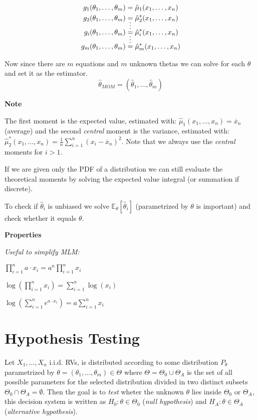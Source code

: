 \documentclass[8pt,a4paper]{extarticle}     %
\newcommand{\colfill}{\vfill\eject\columnbreak}
\begin{document}
\begin{multicols}{4}
\begin{boxguide}[Evaluation]
\begin{listnr}
		\begin{align*}
			g_1(\theta_1,\dots,\theta_m) &= \hat{\mu}_1(x_1,\dots,x_n) \\
			g_2(\theta_1,\dots,\theta_m) &= \hat{\mu}_2^*(x_1,\dots,x_n) \\ 
			&\shortvdotswithin{=} 
			g_i(\theta_1,\dots,\theta_m) &= \hat{\mu}_i^*(x_1,\dots,x_n) \\ 
			&\shortvdotswithin{=} 
			g_m(\theta_1,\dots,\theta_m) &= \hat{\mu}_m^*(x_1,\dots,x_n) 
		\end{align*}
		\item Now since there are $m$ equations and $m$ unknown thetas we can solve for each $\theta$ and set it as the estimator.
		\[
			\hat{\theta}_{MOM}=(\hat{\theta}_1,\dots,\hat{\theta}_m)
		\]
	\end{listnr}
\end{boxguide}
\begin{listb}
	\item [] \textbf{Note}
	\item The first moment is the expected value, estimated with: $\hat{\mu}_1(x_1,\dots,x_n) = \overline{x}_n$ (average) and the second \textit{central} moment is the variance, estimated with: $\hat{\mu}_2^*(x_1,\dots,x_n) = \frac{1}{n}\sum_{i=1}^{n}(x_i-\overline{x}_n)^2$. Note that we always use the \textit{central} moments for $i>1$. 
	\item If we are given only the PDF of a distribution we can still evaluate the theoretical moments by solving the expected value integral (or summation if discrete). 
	\item To check if $\hat{\theta}_i$ is unbiased we solve $\mathbb{E}_\theta[\hat{\theta}_i]$ (parametrized by $\theta$ is important) and check whether it equals $\theta$. 
	\item [] \textbf{Properties} 
	\item [] \textit{Useful to simplify MLM: } 
	\item $\prod_{i=1}^{n}a\cdot x_i = a^n\prod_{i=1}^{n}x_i$ 
	\item $\log\left(\prod_{i=1}^{n} x_i\right)=\sum_{i=1}^{n}\log(x_i)$ 
	\item $\log\left(\sum_{i=1}^{n}e^{a\cdot x_i}\right) = a\sum_{i=1}^{n}x_i$ 
\end{listb}

\colfill
\section{Hypothesis Testing}
Let $X_1,\dots,X_n$ i.i.d. RVs, is distributed according to some distribution $P_\theta$ parametrized by $\theta=(\theta_1,\dots,\theta_m)\in\Theta$ where $\Theta=\Theta_0\cup\Theta_A$ is the set of all possible parameters for the selected distribution divided in two distinct subsets $\Theta_0\cap\Theta_A=\emptyset$. Then the goal is to \textit{test} wheter the unknown $\theta$ lies inside $\Theta_0$ or $\Theta_A$, this decision system is written as $H_0: \theta\in\Theta_0$ (\textit{null hypothesis}) and $H_A: \theta\in\Theta_A$ (\textit{alternative hypothesis}). 


\end{multicols}
\end{document}

